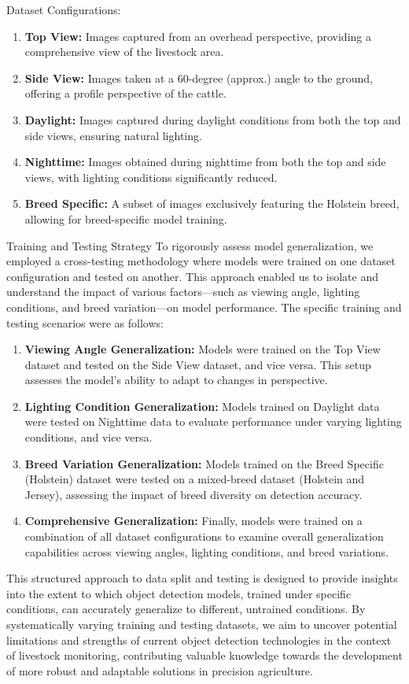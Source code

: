 Dataset Configurations:
\begin{enumerate}
    \item\textbf{Top View:} Images captured from an overhead perspective, providing a comprehensive view of the livestock area.
    \item\textbf{Side View:} Images taken at a 60-degree (approx.) angle to the ground, offering a profile perspective of the cattle.
    \item\textbf{Daylight:} Images captured during daylight conditions from both the top and side views, ensuring natural lighting.
    \item\textbf{Nighttime:} Images obtained during nighttime from both the top and side views, with lighting conditions significantly reduced.
    \item\textbf{Breed Specific:} A subset of images exclusively featuring the Holstein breed, allowing for breed-specific model training.
\end{enumerate}
Training and Testing Strategy
To rigorously assess model generalization, we employed a cross-testing methodology where models were trained on one dataset configuration and tested on another. This approach enabled us to isolate and understand the impact of various factors—such as viewing angle, lighting conditions, and breed variation—on model performance. The specific training and testing scenarios were as follows:
\begin{enumerate}
    \item\textbf{Viewing Angle Generalization:} Models were trained on the Top View dataset and tested on the Side View dataset, and vice versa. This setup assesses the model's ability to adapt to changes in perspective.
    \item\textbf{Lighting Condition Generalization:} Models trained on Daylight data were tested on Nighttime data to evaluate performance under varying lighting conditions, and vice versa.
    \item\textbf{Breed Variation Generalization:} Models trained on the Breed Specific (Holstein) dataset were tested on a mixed-breed dataset (Holstein and Jersey), assessing the impact of breed diversity on detection accuracy.
    \item\textbf{Comprehensive Generalization:} Finally, models were trained on a combination of all dataset configurations to examine overall generalization capabilities across viewing angles, lighting conditions, and breed variations.
\end{enumerate}
This structured approach to data split and testing is designed to provide insights into the extent to which object detection models, trained under specific conditions, can accurately generalize to different, untrained conditions. By systematically varying training and testing datasets, we aim to uncover potential limitations and strengths of current object detection technologies in the context of livestock monitoring, contributing valuable knowledge towards the development of more robust and adaptable solutions in precision agriculture.

